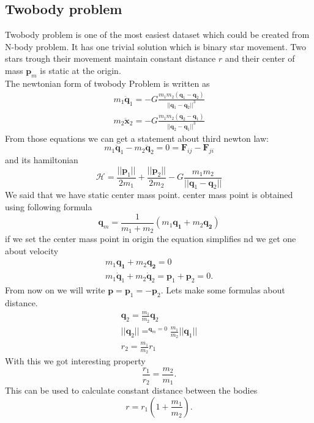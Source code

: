 \subsection{Twobody problem}
Twobody problem is one of the most easiest dataset which could be created from N-body problem. It has one trivial solution which is binary star movement.
Two stars trough their movement maintain constant distance $r$ and their center of mass $\mathbf{p}_m$ is static at the origin.\\
The newtonian form of twobody Problem is written as
\begin{eqnarray}
	m_1\ddot{\mathbf{q}}_1 = -G\frac{m_1m_2(\mathbf{q}_1-\mathbf{q}_2)}{||\mathbf{q}_1-\mathbf{q}_2||^3}\\
	m_2\ddot{\mathbf{x}}_2 = -G\frac{m_1m_2(\mathbf{q}_2-\mathbf{q}_1)}{||\mathbf{q}_2-\mathbf{q}_1||^3}
\end{eqnarray}
From those equations we can get a statement about third newton law:
\begin{equation}
	m_1\ddot{\mathbf{q}}_1 -m_2\ddot{\mathbf{q}}_2 = 0 = \mathbf{F}_{ij} - \mathbf{F}_{ji}
\end{equation}
and its hamiltonian
\begin{equation}
\mathcal{H} = \frac{||\mathbf{p}_1||}{2m_1} +\frac{||\mathbf{p}_2||}{2m_2} - G\frac{m_1m_2}{||\mathbf{q}_1 - \mathbf{q}_2||}
\end{equation}
We said that we have static center mass point. center mass point is obtained using following formula
\begin{equation}
	\mathbf{q}_m = \frac{1}{m_1+m_2}(m_1\mathbf{q_1} + m_2\mathbf{q_2})
\end{equation}
if we set the center mass point in origin the equation simplifies nd we get one about velocity
\begin{eqnarray}
	m_1\mathbf{q_1} + m_2\mathbf{q_2} = 0\\
	m_1\dot{\mathbf{q}}_1 + m_2\dot{\mathbf{q}}_2 = \mathbf{p}_1 +\mathbf{p}_2 = 0.
\end{eqnarray}
From now on we will write $\mathbf{p} =\mathbf{p}_1 = -\mathbf{p}_2$.
Lets make some formulas about distance. 
\begin{eqnarray}
	\mathbf{q}_2 = \frac{m_1}{m_2}\mathbf{q}_2\\
	||\mathbf{q}_2|| =^{\mathbf{q}_m=0} \frac{m_1}{m_2}||\mathbf{q}_1||\\ 
	r_2 =\frac{m_1}{m_2}r_1
\end{eqnarray}
With this we got interesting property
\begin{equation}
	\frac{r_1}{r_2} =\frac{m_2}{m_1}. 
\end{equation}
This can be used to calculate constant distance between the bodies
\begin{equation}
	r=r_1\left(1 + \frac{m_1}{m_2}\right).
\end{equation}

